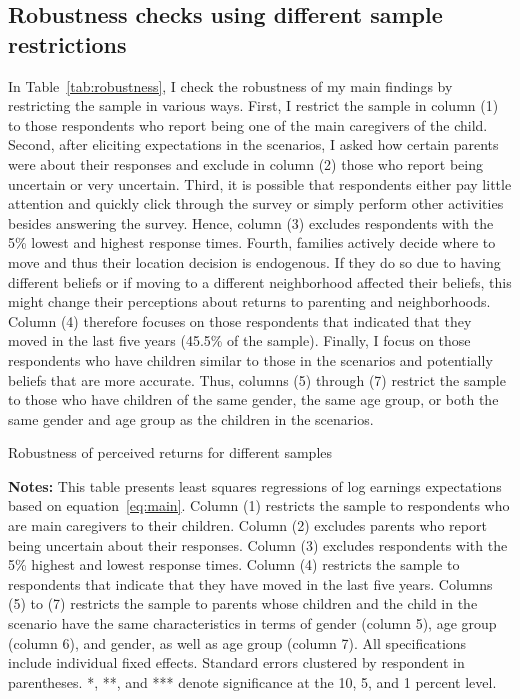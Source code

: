 \documentclass[12pt, a4paper, english]{article}
\begin{document}
\subsection{Robustness checks using different sample restrictions}\label{sec:robustness_sample}
In Table~\ref{tab:robustness}, I check the robustness of my main findings by restricting the sample in various ways. First, I restrict the sample in column (1) to those respondents who report being one of the main caregivers of the child. Second, after eliciting expectations in the scenarios, I asked how certain parents were about their responses and exclude in column (2) those who report being uncertain or very uncertain. Third, it is possible that respondents either pay little attention and quickly click through the survey or simply perform other activities besides answering the survey. Hence, column (3) excludes respondents with the 5\% lowest and highest response times. Fourth, families actively decide where to move and thus their location decision is endogenous. If they do so due to having different beliefs or if moving to a different neighborhood affected their beliefs, this might change their perceptions about returns to parenting and neighborhoods. Column (4) therefore focuses on those respondents that indicated that they moved in the last five years (45.5\% of the sample). Finally, I focus on those respondents who have children similar to those in the scenarios and potentially beliefs that are more accurate. Thus, columns (5) through (7) restrict the sample to those who have children of the same gender, the same age group, or both the same gender and age group as the children in the scenarios.

\begin{table}[h!]
    \caption{Robustness of perceived returns for different samples}\label{tab:robustness}
    \resizebox{\textwidth}{!}{
        
    }
    \vspace{0.5em}
    \caption*{\footnotesize \textbf{Notes:} This table presents least squares regressions of log earnings expectations based on equation~\eqref{eq:main}. Column (1) restricts the sample to respondents who are main caregivers to their children. Column (2) excludes parents who report being uncertain about their responses. Column (3) excludes respondents with the 5\% highest and lowest response times. Column (4) restricts the sample to respondents that indicate that they have moved in the last five years. Columns (5) to (7) restricts the sample to parents whose children and the child in the scenario have the same characteristics in terms of gender (column 5), age group (column 6), and gender, as well as age group (column 7). All specifications include individual fixed effects. Standard errors clustered by respondent in parentheses. *, **, and *** denote significance at the 10, 5, and 1 percent level.}
\end{table}
\end{document}
